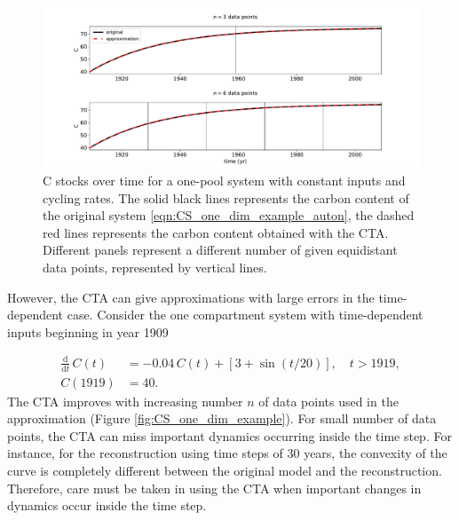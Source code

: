 \documentclass[draft]{agujournal2019}
\newcommand{\deriv}[1]{\frac{\mathrm{d}}{\mathrm{d}#1}}
\begin{document}
\begin{figure}[htbp]
    \centering 
    \includegraphics[width=1.0\linewidth]{figs/interpol_pwc_1_auton.pdf}
    \caption{C stocks over time for a one-pool system with constant inputs and cycling rates.
        The solid black lines represents the carbon content of the original system \eqref{eqn:CS_one_dim_example_auton}, the dashed red lines represents the carbon content obtained with the CTA.
        Different panels represent a different number of given equidistant data points, represented by vertical lines.
        }
    \label{fig:CS_one_dim_example_auton}
\end{figure}        

However, the CTA can give approximations with large errors in the time-dependent case. 
Consider the one compartment system with time-dependent inputs beginning in year 1909

\begin{equation}\label{eqn:CS_one_dim_example}
    \begin{aligned}
        \deriv{t}\,C(t) &= -0.04\,C(t) + \left[3+\sin(t/20)\right],\quad t>1919,\\
        C(1919) &= 40.
    \end{aligned}
\end{equation}
 The CTA improves with increasing number $n$ of data points used in the approximation (Figure \ref{fig:CS_one_dim_example}).
 For small number of data points, the CTA can miss important dynamics occurring inside the time step. For instance, for the reconstruction using time steps of 30 years, the convexity of the curve is completely different between the original model and the reconstruction. Therefore, care must be taken in using the CTA when important changes in dynamics occur inside the time step. 
\end{document}
